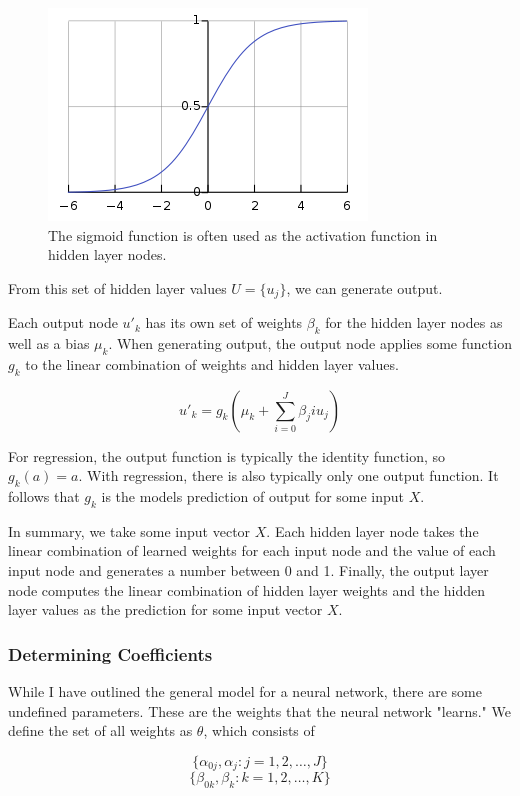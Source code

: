 \documentclass[12pt]{article}
\begin{document}
\begin{figure}[ht]
	\centering
	\includegraphics[width=.5\textwidth]{sigmoid.png}
	\caption{The sigmoid function is often used as the activation function in hidden layer nodes.}
	\label{sigmoid}
	
\end{figure}

From this set of hidden layer values $U = \{u_j\}$, we can generate output.

Each output node $u'_k$ has its own set of weights $\beta_k$ for the hidden layer nodes as well as a bias $\mu_k$. 
When generating output, the output node applies some function $g_k$ to the linear combination of weights and hidden layer values.

$$u'_k = g_k( \mu_k + \sum_{i=0}^{J} \beta_ji u_j)$$

For regression, the output function is typically the identity function, so $g_k(a) = a$. With regression, there is also typically only one output function. It follows that $g_k$ is the models prediction of output for some input $X$.\cite[350-351]{springer}

In summary, we take some input vector $X$. Each hidden layer node takes the linear combination of learned weights for each input node and the value of each input node and generates a number between 0 and 1. Finally, the output layer node computes the linear combination of hidden layer weights and the hidden layer values as the prediction for some input vector $X$.

\subsubsection{Determining Coefficients}
While I have outlined the general model for a neural network, there are some undefined parameters. These are the weights that the neural network "learns." We define the set of all weights as $\theta$, which consists of 

$$\{\alpha_{0j}, \alpha_j: j = 1, 2, \dots, J\}$$
$$\{\beta_{0k}, \beta_k:  k= 1, 2, \dots, K\}$$
\end{document}
